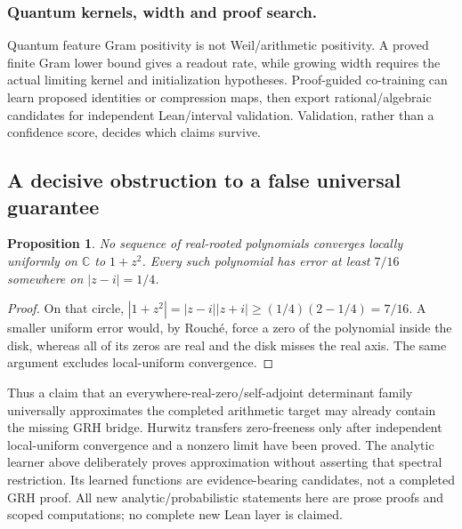 \documentclass[11pt]{article}
\newtheorem{proposition}[theorem]{Proposition}
\theoremstyle{definition}\newtheorem{definition}[theorem]{Definition}
\theoremstyle{remark}\newtheorem{remark}[theorem]{Remark}
\begin{document}
\subsubsection{Quantum kernels, width and proof search.}
Quantum feature Gram positivity is not Weil/arithmetic positivity. A proved
finite Gram lower bound gives a readout rate, while growing width requires
the actual limiting kernel and initialization hypotheses. Proof-guided
co-training can learn proposed identities or compression maps, then export
rational/algebraic candidates for independent Lean/interval validation.
Validation, rather than a confidence score, decides which claims survive.

\subsection{A decisive obstruction to a false universal guarantee}
\begin{proposition}\label{hl:real-root-floor}
No sequence of real-rooted polynomials converges locally uniformly on
$\mathbb C$ to $1+z^2$. Every such polynomial has error at least $7/16$
somewhere on $|z-i|=1/4$.
\end{proposition}
\begin{proof}
On that circle, $|1+z^2|=|z-i||z+i|\ge(1/4)(2-1/4)=7/16$.
A smaller uniform error would, by Rouch\'e, force a zero of the polynomial
inside the disk, whereas all of its zeros are real and the disk misses the
real axis. The same argument excludes local-uniform convergence.
\end{proof}
Thus a claim that an everywhere-real-zero/self-adjoint determinant family
universally approximates the completed arithmetic target may already contain
the missing GRH bridge. Hurwitz transfers zero-freeness only after independent
local-uniform convergence and a nonzero limit have been proved. The analytic
learner above deliberately proves approximation without asserting that
spectral restriction. Its learned functions are evidence-bearing candidates,
not a completed GRH proof. All new analytic/probabilistic statements here are
prose proofs and scoped computations; no complete new Lean layer is claimed.
\end{document}
